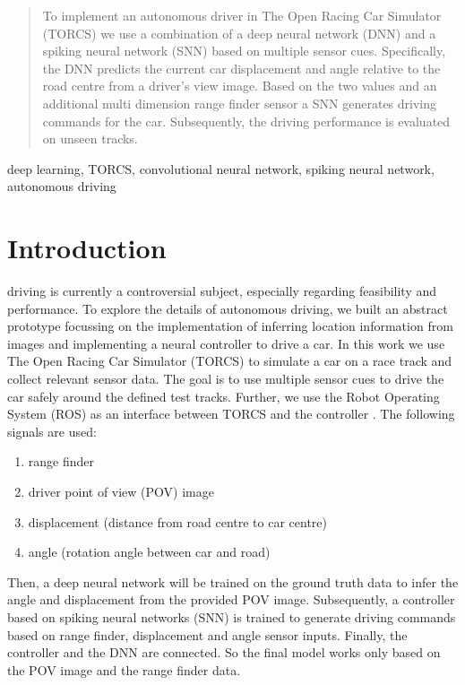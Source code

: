 \documentclass[10pt,a4paper,twoside,journal]{IEEEtran}
\begin{document}
\begin{abstract}
	To implement an autonomous driver in The Open Racing Car Simulator (TORCS)
	we use a combination of a deep neural network (DNN) and a spiking neural network (SNN) based on multiple
	sensor cues. Specifically, the DNN predicts the current car displacement
	and angle relative to the road centre from a driver's view image. Based on the two values
	and an additional multi dimension range finder sensor a SNN generates driving commands for the car. Subsequently, the driving performance is evaluated on unseen tracks.
\end{abstract}

\begin{IEEEkeywords}
	deep learning, TORCS, convolutional neural network, spiking neural network, autonomous driving
\end{IEEEkeywords}

%
%
\section{Introduction}
\label{sc:intro}

 driving is currently a controversial subject, especially 
regarding feasibility and performance. To explore the details of autonomous driving, we built an abstract prototype focussing on the implementation of inferring location information from images and implementing a neural controller to drive a car. In this work we use The Open Racing Car Simulator (TORCS) to simulate a car on a race track and collect relevant sensor data. The goal is to use multiple sensor cues to drive the car safely around the defined test tracks. Further, we use the Robot Operating System (ROS) \cite{ros-2009} as an interface between TORCS and the controller \cite{mirus_torcs-ros_2017}. The following signals are used:
\begin{enumerate}
	\item range finder
	\item driver point of view (POV) image
	\item displacement (distance from road centre to car centre)
	\item angle (rotation angle between car and road)
\end{enumerate}
Then, a deep neural network will be trained on the ground truth data to infer the angle and displacement from the provided POV image. Subsequently, a controller based on spiking neural networks (SNN) is trained to generate driving commands based on range finder, displacement and angle sensor inputs. Finally, the controller and the DNN are connected. So the final model works only based on the POV image and the range finder data.
\end{document}
